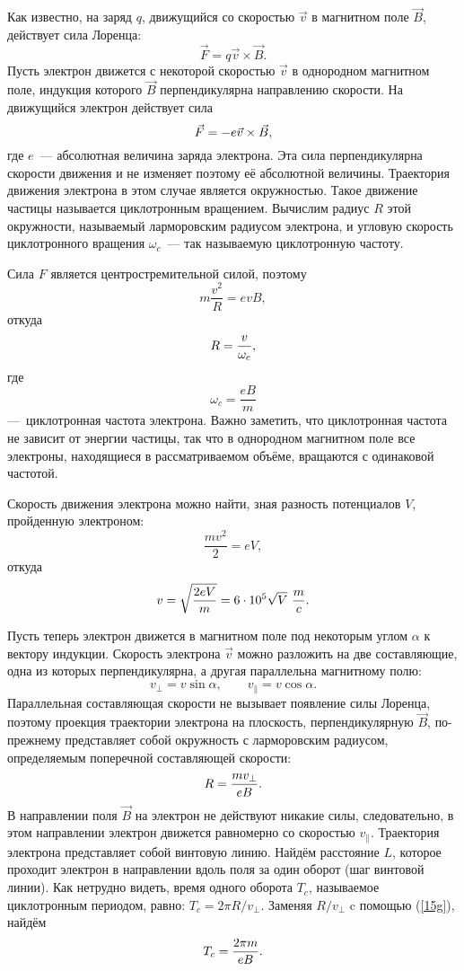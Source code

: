 Как известно, на заряд $q$, движущийся со скоростью $\vec{v}$ в магнитном поле $\vec{B}$, действует сила Лоренца:
$$
\vec{F}=q{\vec{v}}\times{\vec{B}}.
$$
Пусть электрон движется с некоторой скоростью $\vec{v}$ в однородном магнитном поле, индукция которого $\vec{B}$
перпендикулярна направлению скорости. На движущийся электрон действует сила %
\begin{equation}
	\eqmark{12g}
	\vec{F}=-e{\vec{v}}\times{\vec{B}},
\end{equation}
где $e$~--- абсолютная величина заряда электрона. Эта сила перпендикулярна скорости движения и не изменяет поэтому её абсолютной величины. Траектория движения электрона в этом случае является окружностью. Такое движение частицы называется циклотронным вращением. Вычислим радиус $R$ этой окружности, называемый \textsf{ларморовским радиусом} электрона, и угловую скорость циклотронного вращения $\omega_c$~--- так называемую \textsf{циклотронную частоту}.

Сила $F$ является центростремительной силой, поэтому
$$
m\frac{v^2}{R}=evB,
$$
откуда
\begin{equation}
	\eqmark{13g}
	R =\frac{v}{\omega_c},
\end{equation}
где
$$
\omega_c=\frac{eB}{m}
$$
---~циклотронная частота электрона. Важно заметить, что циклотронная частота не зависит от энергии частицы, так что в однородном магнитном поле все электроны, находящиеся в рассматриваемом объёме, вращаются с одинаковой частотой.

Скорость движения электрона можно найти, зная разность потенциалов $V$, пройденную электроном:
$$
\frac{mv^2}{2}=eV,
$$
откуда
\begin{equation}
	\eqmark{14g}
	v=\sqrt{\frac{2eV}{m}} = 6\cdot10^5\sqrt{V}~\frac{m}{c}.
\end{equation}

Пусть теперь электрон движется в магнитном поле под некоторым углом $\alpha$ к вектору индукции. Скорость электрона
$\vec{v}$ можно разложить на две составляющие, одна из которых перпендикулярна, а другая параллельна магнитному полю:
$$
v_{\bot}=v\sin\alpha,\qquad v_{\parallel}=v\cos\alpha.
$$
Параллельная составляющая скорости не вызывает появление силы Лоренца, поэтому проекция траектории электрона на
плоскость, перпендикулярную $\vec{B}$, по-прежнему представляет собой окружность с ларморовским радиусом, определяемым поперечной составляющей скорости:
\begin{equation}
	\eqmark{15g}
	R =\frac{mv_{\bot}}{eB}.
\end{equation}
В направлении поля $\vec{B}$ на электрон не действуют никакие силы, следовательно, в этом направлении электрон движется равномерно со скоростью $v_{\parallel}$. Траектория электрона представляет собой винтовую линию. Найдём расстояние $L$, которое проходит электрон в направлении вдоль поля за один оборот (шаг винтовой линии). Как нетрудно видеть, время одного оборота $T_c$, называемое циклотронным периодом, равно: $T_c=2\pi R/v_{\bot}$. Заменяя $R/v_{\bot}$ c помощью (\eqref{15g}), найдём
\begin{equation}
	\eqmark{16g}
T_c =\frac{2\pi m}{eB}.
\end{equation}

